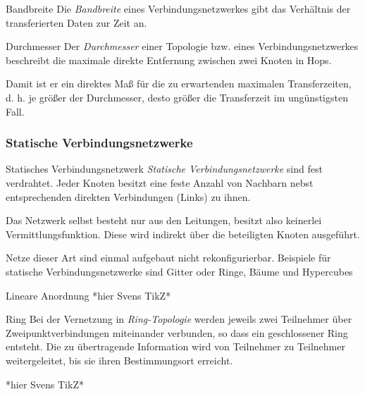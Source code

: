 \begin{defi}[Verbindungsnetzwerk]{Bandbreite}
    Die \emph{Bandbreite} eines Verbindungsnetzwerkes gibt das Verhältnis der transferierten Daten zur Zeit an.
\end{defi}

\begin{defi}[Verbindungsnetzwerk]{Durchmesser}
    Der \emph{Durchmesser} einer Topologie bzw. eines Verbindungsnetzwerkes beschreibt die maximale direkte Entfernung zwischen zwei Knoten in Hops.

    Damit ist er ein direktes Maß für die zu erwartenden maximalen Transferzeiten, d. h. je größer der Durchmesser, desto größer die Transferzeit im ungünstigsten Fall.
\end{defi}

\subsubsection{Statische Verbindungsnetzwerke}

\begin{defi}{Statisches Verbindungsnetzwerk}
    \emph{Statische Verbindungsnetzwerke} sind fest verdrahtet.
    Jeder Knoten besitzt eine feste Anzahl von Nachbarn nebst entsprechenden direkten Verbindungen (Links) zu ihnen.

    Das Netzwerk selbst besteht nur aus den Leitungen, besitzt also keinerlei Vermittlungsfunktion.
    Diese wird indirekt über die beteiligten Knoten ausgeführt.

    Netze dieser Art sind einmal aufgebaut nicht rekonfigurierbar.
    Beispiele für statische Verbindungsnetzwerke sind Gitter oder Ringe, Bäume und Hypercubes
\end{defi}

\begin{defi}{Lineare Anordnung}
    *hier Svens TikZ*
\end{defi}

\begin{defi}{Ring}
    Bei der Vernetzung in \emph{Ring-Topologie} werden jeweils zwei Teilnehmer über Zweipunktverbindungen miteinander verbunden, so dass ein geschlossener Ring entsteht. Die zu übertragende Information wird von Teilnehmer zu Teilnehmer weitergeleitet, bis sie ihren Bestimmungsort erreicht.

    *hier Svens TikZ*
\end{defi}


